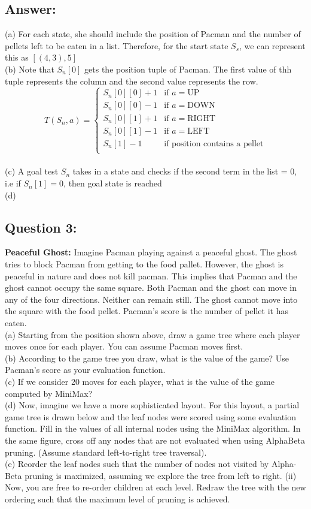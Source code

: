 \documentclass{article}
\begin{document}
\subsection*{Answer:}
(a) For each state, she should include the position of Pacman and the number of pellets left to be eaten in a list. Therefore, for the start state $S_s$, we can represent this as $[(4,3), 5]$
\\
(b) Note that $S_n[0]$ gets the position tuple of Pacman. The first value of thh tuple represents the column and the second value represents the row.
\[T(S_n, a) =
\begin{cases}
    S_n[0][0] + 1 & \text{if } a = \text{UP} \\
    S_n[0][0] - 1 & \text{if } a = \text{DOWN} \\
    S_n[0][1] + 1 & \text{if } a = \text{RIGHT} \\
    S_n[0][1] - 1 & \text{if } a = \text{LEFT} \\
    S_n[1] - 1 & \text{if position contains a pellet} \\
\end{cases}
\]
\\
(c) A goal test $S_n$ takes in a state and checks if the second term in the list = 0, i.e if $S_n[1] = 0$, then goal state is reached
\\
(d)

\subsection*{Question 3:}
\textbf{Peaceful Ghost:} Imagine Pacman playing against a peaceful ghost. The ghost
tries to block Pacman from getting to the food pallet. However, the ghost is peaceful in
nature and does not kill pacman. This implies that Pacman and the ghost cannot occupy
the same square. Both Pacman and the ghost can move in any of the four directions.
Neither can remain still. The ghost cannot move into the square with the food pellet.
Pacman's score is the number of pellet it has eaten.
\\
(a) Starting from the position shown above, draw a game tree where each
player moves once for each player. You can assume Pacman moves first.
\\
(b) According to the game tree you draw, what is the value of the game? Use
Pacman's score as your evaluation function.
\\
(c) If we consider 20 moves for each player, what is the value of the game
computed by MiniMax?
\\
(d) Now, imagine we have a more sophisticated layout. For this layout, a
partial game tree is drawn below and the leaf nodes were scored using some evaluation function. Fill in the values of all internal nodes using the MiniMax algorithm. In the same figure, cross off any nodes that are not evaluated when using AlphaBeta pruning. (Assume standard left-to-right tree traversal).
\\
(e) Reorder the leaf nodes such that the number of nodes not visited by Alpha-Beta pruning is maximized, assuming we explore the tree from left to right.
(ii) Now, you are free to re-order children at each level. Redraw the tree with the new ordering such that the maximum level of pruning is achieved.
\end{document}
